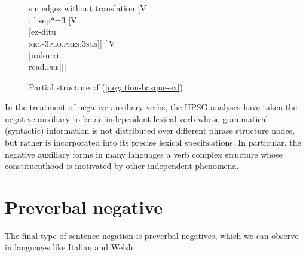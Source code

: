 \documentclass[output=paper
	        ,collection
	        ,collectionchapter
 	        ,biblatex
                ,babelshorthands
                ,newtxmath
                ,draftmode
                ,colorlinks, citecolor=brown
]{langscibook}
\begin{document}
{\begin{exe}
\begin{xlist}
\begin{figure}
	\begin{forest}
sm edges without translation
		[{V\\
		  }, l sep*=3
		  [{V\\
		    }
			[ez-ditu\\ \textsc{neg}-3\textsc{plo.pres.3sgs}]]
			[{\,V\\
			  \avmtmp{
			  [comps & \2 < NP > ]
			  }}
					[irakurri\\read.\textsc{prf}]]]
	\end{forest}
\caption{Partial structure of (\ref{negation-basque-ex})}\label{negation-basque}
\end{figure}
%
%
%
In the treatment of negative auxiliary verbs, the HPSG analyses
have taken the negative auxiliary to be an independent lexical
verb whose grammatical (syntactic) information is not distributed
over different phrase structure nodes, but rather is incorporated into
its precise lexical specifications. In particular, the negative
auxiliary forms in many languages a verb complex structure whose
constituenthood is motivated by other independent phenomena.



\section{Preverbal negative}

The final type of sentence negation is preverbal negatives, which
we can observe in languages like Italian and Welsh:


\end{xlist}
\end{exe}}
\end{document}

